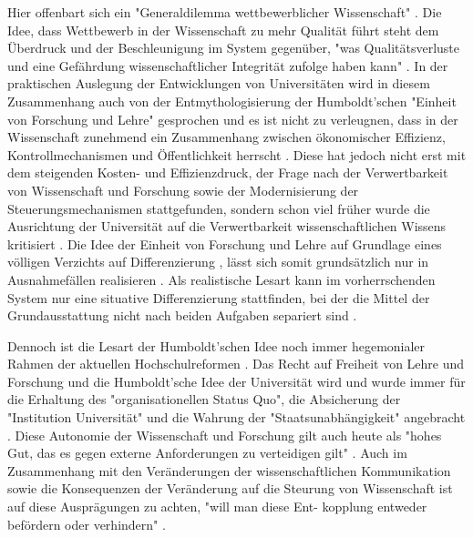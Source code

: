 Hier offenbart sich ein "Generaldilemma wettbewerblicher Wissenschaft" \cite[:37]{Wissenschaftsrat_2015}. Die Idee, dass Wettbewerb in der Wissenschaft zu mehr Qualität führt steht dem Überdruck und der Beschleunigung im System gegenüber, "was Qualitätsverluste und eine Gefährdung wissenschaftlicher Integrität zufolge haben kann" \cite[:37]{Wissenschaftsrat_2015}. In der praktischen Auslegung der Entwicklungen von Universitäten wird in diesem Zusammenhang auch von der Entmythologisierung der Humboldt’schen "Einheit von Forschung und Lehre" gesprochen \cite{Binswanger_2014} \cite[:299]{Schimank_2001} \cite[:343]{Kruecken_2001} und es ist nicht zu verleugnen, dass in der Wissenschaft zunehmend ein Zusammenhang zwischen ökonomischer Effizienz, Kontrollmechanismen und Öffentlichkeit herrscht \cite[:27]{Reinhart_2006} \cite{Foucault_1977}  \cite{Meier_2009}. Diese hat jedoch nicht erst mit dem steigenden Kosten- und Effizienzdruck, der Frage nach der Verwertbarkeit von Wissenschaft und Forschung sowie der Modernisierung der Steuerungsmechanismen stattgefunden, sondern schon viel früher wurde die Ausrichtung der Universität auf die Verwertbarkeit wissenschaftlichen Wissens kritisiert \cite{Huber_2005}. Die Idee der Einheit von Forschung und Lehre auf Grundlage eines völligen Verzichts auf Differenzierung \cite{kittler_2004}, lässt sich somit grundsätzlich nur in Ausnahmefällen realisieren \cite{Schimank_2001}. Als realistische Lesart kann im vorherrschenden System nur eine situative Differenzierung stattfinden, bei der die Mittel der Grundausstattung nicht nach beiden Aufgaben separiert sind \cite{Schimank_2001}.

Dennoch ist die Lesart der Humboldt’schen Idee noch immer hegemonialer Rahmen der aktuellen Hochschulreformen \cite{Huber_2005}. Das Recht auf Freiheit von Lehre und Forschung und die Humboldt’sche Idee der Universität wird und wurde immer für die Erhaltung des "organisationellen Status Quo", die Absicherung der "Institution Universität" und die Wahrung der "Staatsunabhängigkeit" angebracht \cite{Huber_2005}. Diese Autonomie der Wissenschaft und Forschung gilt auch heute als "hohes Gut, das es gegen externe Anforderungen zu verteidigen gilt" \cite{Kaldewey_2010}. Auch im Zusammenhang mit den Veränderungen der wissenschaftlichen Kommunikation sowie die Konsequenzen der Veränderung auf die Steurung von Wissenschaft ist auf diese Ausprägungen zu achten, "will man diese Ent-
kopplung entweder befördern oder verhindern" \cite[:57]{Meier_2009}.

